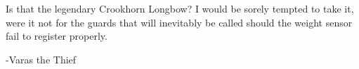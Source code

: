 \documentclass[white]{grimrock}
\begin{document}
\name{\wArmory{}}

Is that the legendary Crookhorn Longbow? I would be sorely tempted to take it, were it not for the guards that will inevitably be called should the weight sensor fail to register properly.

								-Varas the Thief
\end{document}
